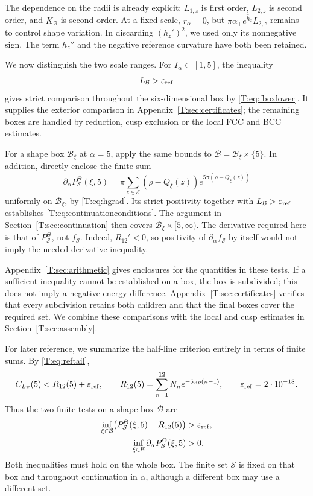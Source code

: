 \documentclass[reqno,english]{amsart}
\theoremstyle{definition}
\newtheorem{open problem}[theorem]{Open Problem}
\theoremstyle{remark}
\theoremstyle{plain}
\numberwithin{equation}{section}
\newcommand{\FCC}{L_{\mathrm F}}
\newcommand{\epsref}{\varepsilon_{\rm ref}}
\begin{document}
The dependence on the radii is already explicit: $L_{1,z}$ is first
order, $L_{2,z}$ is second order, and $K_{\mathcal B}$ is second
order. At a fixed scale, $r_\alpha=0$, but
$\pi\alpha_+\overline{e^{h_z}}L_{2,z}$ remains to control shape
variation. In discarding $(h_z')^2$, we used only its nonnegative
sign. The term $h_z''$ and the negative reference curvature have both
been retained.

We now distinguish the two scale ranges. For
$I_\alpha\subset[1,5]$, the inequality
\[
 L_{\mathcal B}>\epsref
\]
gives strict comparison throughout the six-dimensional box by
\eqref{T:eq:fboxlower}. It supplies the exterior comparison in
Appendix~\ref{T:sec:certificates}; the remaining boxes are handled
by reduction, cusp exclusion or the local FCC and BCC estimates.

For a shape box $\mathcal B_\xi$ at $\alpha=5$, apply the same bounds
to $\mathcal B=\mathcal B_\xi\times\{5\}$. In addition, directly
enclose the finite sum
\[
 \partial_\alpha P^{\Theta}_{\mathcal S}(\xi,5)
 =\pi\sum_{z\in\mathcal S}(\rho-Q_\xi(z))
                  e^{5\pi(\rho-Q_\xi(z))}
\]
uniformly on $\mathcal B_\xi$, by \eqref{T:eq:hgrad}.
Its strict positivity together with $L_{\mathcal B}>\epsref$
establishes \eqref{T:eq:continuationconditions}. The argument in
Section~\ref{T:sec:continuation} then covers
$\mathcal B_\xi\times[5,\infty)$.
The derivative required here is that of $P^{\Theta}_{\mathcal S}$,
not $f_{\mathcal S}$. Indeed, $R_{12}'<0$, so positivity of
$\partial_\alpha f_{\mathcal S}$ by itself would not imply the
needed derivative inequality.

Appendix~\ref{T:sec:arithmetic} gives enclosures for the quantities
in these tests. If a sufficient inequality cannot be established on a
box, the box is subdivided; this does not imply a negative energy
difference. Appendix~\ref{T:sec:certificates} verifies that every
subdivision retains both children and that the final boxes cover the
required set. We combine these comparisons with the local and cusp
estimates in Section~\ref{T:sec:assembly}.


For later reference, we summarize the half-line criterion entirely in
terms of finite sums. By \eqref{T:eq:reftail},
\[
 C_{\FCC}(5)<R_{12}(5)+\epsref,
 \qquad
 R_{12}(5)=\sum_{n=1}^{12}N_n e^{-5\pi\rho(n-1)},
 \qquad
 \epsref=2\cdot10^{-18}.
\]
Thus the two finite tests on a shape box $\mathcal B$ are
\[
 \begin{aligned}
 \inf_{\xi\in\mathcal B}
   \bigl(P^{\Theta}_{\mathcal S}(\xi,5)-R_{12}(5)\bigr)
     &>\epsref,\\
 \inf_{\xi\in\mathcal B}
   \partial_\alpha P^{\Theta}_{\mathcal S}(\xi,5)
     &>0.
 \end{aligned}
\]
Both inequalities must hold on the whole box. The finite set
$\mathcal S$ is fixed on that box and throughout continuation in
$\alpha$, although a different box may use a different set.
\end{document}
